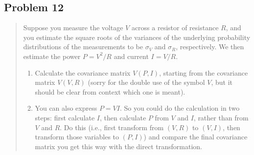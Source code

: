 \documentclass[10pt]{article}
\begin{document}
\subsection*{Problem 12}
\begin{quote}
	Suppose you measure the voltage $V$ across a resistor of resistance $R$, and you estimate the square roots of the variances of the underlying probability distributions of the measurements to be $\sigma_V$ and $\sigma_R$, respectively. We then estimate the power $P=V^2/R$ and current $I=V/R$.
	\begin{enumerate}[label=(\alph*)]
		\item Calculate the covariance matrix $V(P,I)$, starting from the covariance matrix $V(V,R)$ (sorry for the double use of the symbol $V$, but it should be clear from context which one is meant).
		\item You can also express $P=VI$. So you could do the calculation in two steps: first calculate $I$, then calculate $P$ from $V$ and $I$, rather than from $V$ and $R$. Do this (i.e., first transform from $(V,R)$ to $(V,I)$, then transform those variables to $(P,I)$) and compare the final covariance matrix you get this way with the direct transformation.
	\end{enumerate}
\end{quote}

\divider
\end{document}
